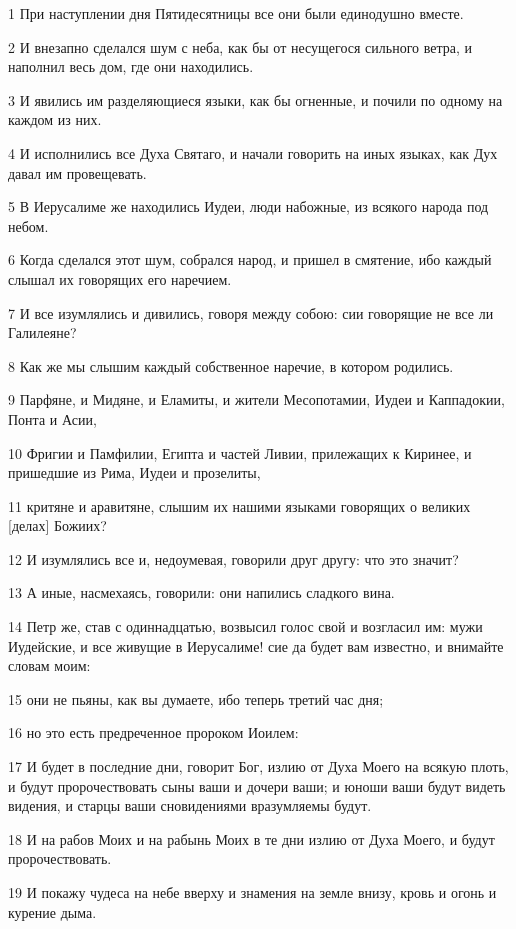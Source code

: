 \par 1 При наступлении дня Пятидесятницы все они были единодушно вместе.
\par 2 И внезапно сделался шум с неба, как бы от несущегося сильного ветра, и наполнил весь дом, где они находились.
\par 3 И явились им разделяющиеся языки, как бы огненные, и почили по одному на каждом из них.
\par 4 И исполнились все Духа Святаго, и начали говорить на иных языках, как Дух давал им провещевать.
\par 5 В Иерусалиме же находились Иудеи, люди набожные, из всякого народа под небом.
\par 6 Когда сделался этот шум, собрался народ, и пришел в смятение, ибо каждый слышал их говорящих его наречием.
\par 7 И все изумлялись и дивились, говоря между собою: сии говорящие не все ли Галилеяне?
\par 8 Как же мы слышим каждый собственное наречие, в котором родились.
\par 9 Парфяне, и Мидяне, и Еламиты, и жители Месопотамии, Иудеи и Каппадокии, Понта и Асии,
\par 10 Фригии и Памфилии, Египта и частей Ливии, прилежащих к Киринее, и пришедшие из Рима, Иудеи и прозелиты,
\par 11 критяне и аравитяне, слышим их нашими языками говорящих о великих [делах] Божиих?
\par 12 И изумлялись все и, недоумевая, говорили друг другу: что это значит?
\par 13 А иные, насмехаясь, говорили: они напились сладкого вина.
\par 14 Петр же, став с одиннадцатью, возвысил голос свой и возгласил им: мужи Иудейские, и все живущие в Иерусалиме! сие да будет вам известно, и внимайте словам моим:
\par 15 они не пьяны, как вы думаете, ибо теперь третий час дня;
\par 16 но это есть предреченное пророком Иоилем:
\par 17 И будет в последние дни, говорит Бог, излию от Духа Моего на всякую плоть, и будут пророчествовать сыны ваши и дочери ваши; и юноши ваши будут видеть видения, и старцы ваши сновидениями вразумляемы будут.
\par 18 И на рабов Моих и на рабынь Моих в те дни излию от Духа Моего, и будут пророчествовать.
\par 19 И покажу чудеса на небе вверху и знамения на земле внизу, кровь и огонь и курение дыма.

